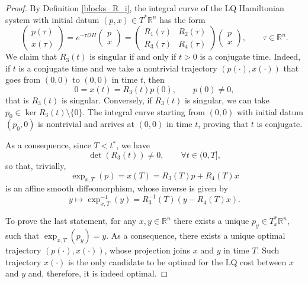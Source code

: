 \documentclass[reqno]{amsart}
\theoremstyle{plain}
\theoremstyle{definition}
\theoremstyle{remark}
\newcommand{\R}{\mathbb{R}}
\begin{document}
	\begin{proof}
By Definition \ref{blocks_R_i}, the integral curve of the LQ Hamiltonian system with initial datum $(p,x) \in T^*\R^n$ has the form
\begin{equation}
    		\begin{pmatrix}
			p(\tau)\\
			x(\tau)
		\end{pmatrix}=e^{-\tau\Omega H}\begin{pmatrix}
			p\\
			x
		\end{pmatrix}=\begin{pmatrix}
				R_1(\tau) & R_2(\tau)\\
				R_3(\tau) & R_4(\tau)
			\end{pmatrix}\begin{pmatrix}
			p\\
			x
		\end{pmatrix}, \qquad \tau\in\mathbb{R}^n.
\end{equation}
		We claim that $R_3(t)$ is singular if and only if $t>0$ is a conjugate time. Indeed, if $t$ is a conjugate time and we take a nontrivial trajectory $(p(\cdot),x(\cdot))$ that goes from $(0,0)$ to $(0,0)$ in time $t$, then
		\begin{equation}
			0=x(t)=R_3(t)p(0),\qquad p(0)\neq 0,
		\end{equation}
		that is $R_3(t)$ is singular. Conversely, if $R_3(t)$ is singular, we can take $p_0\in \ker R_3(t)\setminus\{0\}$. The integral curve starting from $(0,0)$ with initial datum $(p_0,0)$ is nontrivial and arrives at $(0,0)$ in time $t$, proving that $t$ is conjugate.
        
		As a consequence, since $T<t^*$, we have
		\begin{equation}
			\det(R_3(t))\neq 0,\qquad \forall t\in (0,T],
		\end{equation}
		so that, trivially,
		\begin{equation}\label{LQ_exponential_formula}
			\exp_{x,T}(p)=x(T)=R_3(T)p+R_4(T)x
		\end{equation}
		is an affine smooth diffeomorphism, whose inverse is given by 
		\begin{equation}\label{LQ_inverse_exponential_formula}
			y\mapsto \exp_{x,T}^{-1}(y)=R_3^{-1}(T)(y-R_4(T)x).
		\end{equation}

To prove the last statement, for any $x,y \in \R^n$ there exists a unique $p_y\in T^*_x\mathbb{R}^n$, such that $\exp_{x,T}(p_y)=y$. As a consequence, there exists a unique optimal trajectory $(p(\cdot),x(\cdot))$, whose projection joins $x$ and $y$ in time $T$. Such trajectory $x(\cdot)$ is the only candidate to be optimal for the LQ cost between $x$ and $y$ and, therefore, it is indeed optimal.
	\end{proof}
\end{document}
